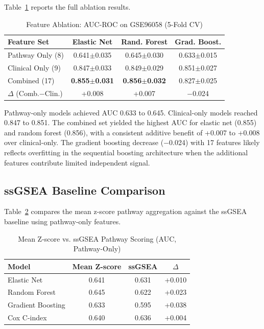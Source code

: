 \documentclass[journal]{IEEEtran}
\begin{document}
Table~\ref{tab:ablation} reports the full ablation results.

\begin{table}[!t]
\centering
\caption{Feature Ablation: AUC-ROC on GSE96058 (5-Fold CV)}
\label{tab:ablation}
\footnotesize
\begin{tabular}{l c c c}
\toprule
\textbf{Feature Set} & \textbf{Elastic Net} & \textbf{Rand. Forest} & \textbf{Grad. Boost.} \\
\midrule
Pathway Only (8) & 0.641$\pm$0.035 & 0.645$\pm$0.030 & 0.633$\pm$0.015 \\
Clinical Only (9) & 0.847$\pm$0.033 & 0.849$\pm$0.029 & 0.851$\pm$0.027 \\
Combined (17) & \textbf{0.855$\pm$0.031} & \textbf{0.856$\pm$0.032} & 0.827$\pm$0.025 \\
\midrule
$\Delta$ (Comb.$-$Clin.) & +0.008 & +0.007 & $-$0.024 \\
\bottomrule
\end{tabular}
\end{table}

Pathway-only models achieved AUC 0.633 to 0.645. Clinical-only models reached 0.847 to 0.851. The combined set yielded the highest AUC for elastic net (0.855) and random forest (0.856), with a consistent additive benefit of +0.007 to +0.008 over clinical-only. The gradient boosting decrease ($-$0.024) with 17 features likely reflects overfitting in the sequential boosting architecture when the additional features contribute limited independent signal.

\subsection{ssGSEA Baseline Comparison}

Table~\ref{tab:ssgsea} compares the mean z-score pathway aggregation against the ssGSEA baseline using pathway-only features.

\begin{table}[!t]
\centering
\caption{Mean Z-score vs. ssGSEA Pathway Scoring (AUC, Pathway-Only)}
\label{tab:ssgsea}
\footnotesize
\begin{tabular}{l c c c}
\toprule
\textbf{Model} & \textbf{Mean Z-score} & \textbf{ssGSEA} & \textbf{$\Delta$} \\
\midrule
Elastic Net & 0.641 & 0.631 & +0.010 \\
Random Forest & 0.645 & 0.622 & +0.023 \\
Gradient Boosting & 0.633 & 0.595 & +0.038 \\
\midrule
Cox C-index & 0.640 & 0.636 & +0.004 \\
\bottomrule
\end{tabular}
\end{table}
\end{document}
